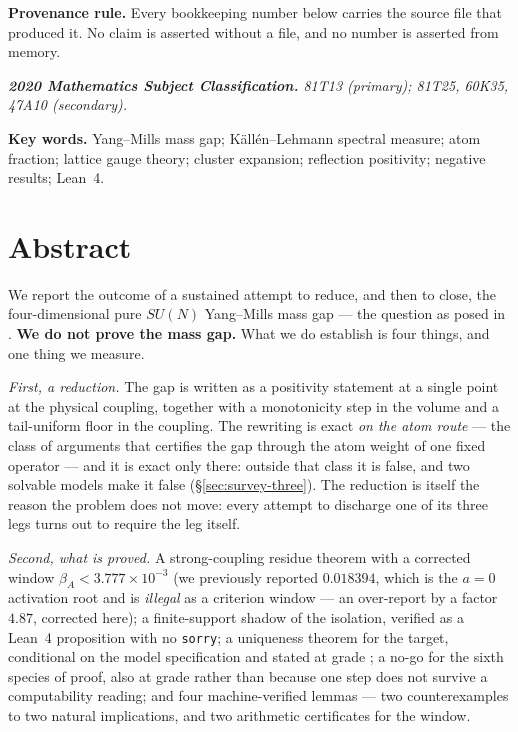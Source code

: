 \documentclass[11pt,a4paper]{article}
\newcommand{\labb}[2]{\fcolorbox{#1!35}{#1!8}{\textcolor{#1}{\textbf{\scriptsize #2}}}}
\newcommand{\LT}{\labb{cT}{T}}
\newcommand{\LC}{\labb{cC}{C}}
\newcounter{claim}
\begin{document}
\begin{titlepage}
\begin{minipage}{0.86\textwidth}
\vspace{0.5em}
\textbf{Provenance rule.} Every bookkeeping number below carries the source file that produced it.
No claim is asserted without a file, and no number is asserted from memory.
\end{minipage}
\vfill
{\footnotesize\itshape
\textbf{2020 Mathematics Subject Classification.} 81T13 (primary); 81T25, 60K35, 47A10 (secondary).\par
\vspace{0.35em}
\textbf{Key words.} Yang--Mills mass gap; K\"all\'en--Lehmann spectral measure; atom fraction;
lattice gauge theory; cluster expansion; reflection positivity; negative results; Lean~4.\par}
\vspace{0.4cm}
\end{titlepage}

\section*{Abstract}

We report the outcome of a sustained attempt to reduce, and then to close, the four-dimensional
pure $SU(N)$ Yang--Mills mass gap --- the question as posed in \cite{jaffe}. \textbf{We do not prove
the mass gap.} What we do establish is
four things, and one thing we measure.

\emph{First, a reduction.} The gap is written as a positivity statement at a single point at the
physical coupling, together with a monotonicity step in the volume and a tail-uniform floor in the
coupling. The rewriting is exact \emph{on the atom route} --- the class of arguments that certifies
the gap through the atom weight of one fixed operator --- and it is exact only there: outside that
class it is false, and two solvable models make it false (\S\ref{sec:survey-three}). The reduction is
itself the reason the problem does not move: every attempt to discharge one of its three legs turns
out to require the leg itself.

\emph{Second, what is proved.} A strong-coupling residue theorem with a corrected window
$\beta_A < 3.777\times10^{-3}$ (we previously reported $0.018394$, which is the $a=0$ activation root
and is \emph{illegal} as a criterion window --- an over-report by a factor $4.87$, corrected here);
a finite-support shadow of the isolation, verified as a Lean~4 proposition with no \texttt{sorry};
a uniqueness theorem for the target, conditional on the model specification and stated at grade
\LC{}; a no-go for the sixth species of proof, also at grade \LC{} rather than \LT{} because one
step does not survive a computability reading; and four machine-verified lemmas --- two
counterexamples to two natural implications, and two arithmetic certificates for the window.
\end{document}
